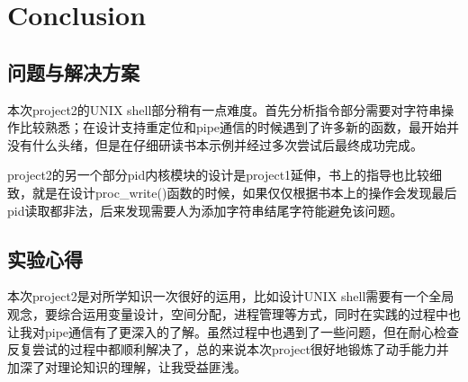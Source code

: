 \documentclass{article}
\begin{document}
\section{Conclusion}

\subsection{问题与解决方案}
本次project2的UNIX shell部分稍有一点难度。首先分析指令部分需要对字符串操作比较熟悉；在设计支持重定位和pipe通信的时候遇到了许多新的函数，最开始并没有什么头绪，但是在仔细研读书本示例并经过多次尝试后最终成功完成。

project2的另一个部分pid内核模块的设计是project1延伸，书上的指导也比较细致，就是在设计proc\_write()函数的时候，如果仅仅根据书本上的操作会发现最后pid读取都非法，后来发现需要人为添加字符串结尾字符能避免该问题。

\subsection{实验心得}
本次project2是对所学知识一次很好的运用，比如设计UNIX shell需要有一个全局观念，要综合运用变量设计，空间分配，进程管理等方式，同时在实践的过程中也让我对pipe通信有了更深入的了解。虽然过程中也遇到了一些问题，但在耐心检查反复尝试的过程中都顺利解决了，总的来说本次project很好地锻炼了动手能力并加深了对理论知识的理解，让我受益匪浅。




\end{document}
